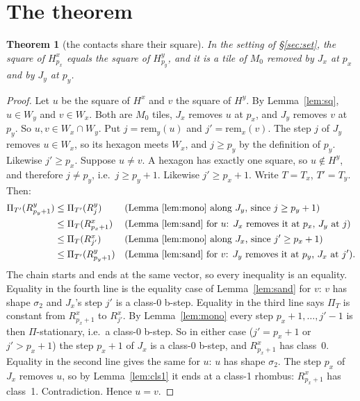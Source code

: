 \documentclass[11pt]{article}
\newtheorem{theorem}{Theorem}\newtheorem{lemma}[theorem]{Lemma}\newtheorem{proposition}[theorem]{Proposition}
\theoremstyle{definition}\newtheorem{definition}[theorem]{Definition}\newtheorem{remark}[theorem]{Remark}
\begin{document}
\section{The theorem}\label{sec:thm}
\begin{theorem}[the contacts share their square]\label{thm:share}
In the setting of \S\ref{sec:set}, the square of $H^x_{p_x}$ equals the square of $H^y_{p_y}$, and it is a tile of $M_0$ removed by $J_x$ at $p_x$ and by $J_y$ at $p_y$.
\end{theorem}
\begin{proof}
Let $u$ be the square of $H^x$ and $v$ the square of $H^y$. By Lemma~\ref{lem:sq}, $u\in W_y$ and $v\in W_x$. Both are $M_0$ tiles, $J_x$ removes $u$ at $p_x$, and $J_y$ removes $v$ at $p_y$. So $u,v\in W_x\cap W_y$.
Put $j=\mathrm{rem}_y(u)$ and $j'=\mathrm{rem}_x(v)$. The step $j$ of $J_y$ removes $u\in W_x$, so its hexagon meets $W_x$, and $j\ge p_y$ by the definition of $p_y$. Likewise $j'\ge p_x$.
Suppose $u\neq v$. A hexagon has exactly one square, so $u\notin H^y$, and therefore $j\neq p_y$, i.e.\ $j\ge p_y+1$. Likewise $j'\ge p_x+1$. Write $T=T_x$, $T'=T_y$. Then:
\begin{align*}
\Pi_{T'}(R^y_{p_y+1})&\le\Pi_{T'}(R^y_{j}) &&\text{(Lemma~\ref{lem:mono} along $J_y$, since $j\ge p_y+1$)}\\
&\le\Pi_{T}(R^x_{p_x+1}) &&\text{(Lemma~\ref{lem:sand} for $u$: $J_x$ removes it at $p_x$, $J_y$ at $j$)}\\
&\le\Pi_{T}(R^x_{j'}) &&\text{(Lemma~\ref{lem:mono} along $J_x$, since $j'\ge p_x+1$)}\\
&\le\Pi_{T'}(R^y_{p_y+1}) &&\text{(Lemma~\ref{lem:sand} for $v$: $J_y$ removes it at $p_y$, $J_x$ at $j'$).}
\end{align*}
The chain starts and ends at the same vector, so every inequality is an equality.
Equality in the fourth line is the equality case of Lemma~\ref{lem:sand} for $v$: $v$ has shape $\sigma_2$ and $J_x$'s step $j'$ is a class-0 b-step. Equality in the third line says $\Pi_T$ is constant from $R^x_{p_x+1}$ to $R^x_{j'}$. By Lemma~\ref{lem:mono} every step $p_x+1,\dots,j'-1$ is then $\Pi$-stationary, i.e.\ a class-0 b-step. So in either case ($j'=p_x+1$ or $j'>p_x+1$) the step $p_x+1$ of $J_x$ is a class-0 b-step, and $R^x_{p_x+1}$ has class~0.
Equality in the second line gives the same for $u$: $u$ has shape $\sigma_2$. The step $p_x$ of $J_x$ removes $u$, so by Lemma~\ref{lem:cls1} it ends at a class-1 rhombus: $R^x_{p_x+1}$ has class~1. Contradiction. Hence $u=v$.
\end{proof}
\end{document}
